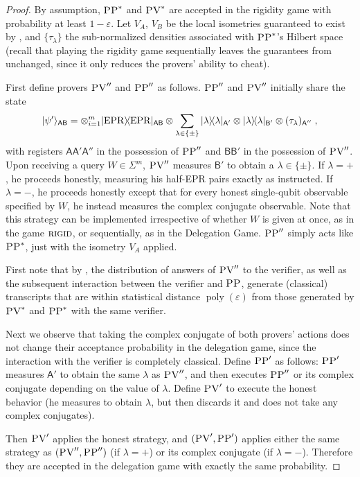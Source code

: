 \documentclass{toc}
\newcommand{\ket}[1]{|#1\rangle}
\newcommand{\bra}[1]{\langle#1|}
\newcommand{\proj}[1]{\ket{#1}\!\bra{#1}}
\DeclareMathOperator{\poly}{poly}
\newcommand{\reg}[1]{{\textsf{#1}}}
\newcommand{\eps}{\varepsilon}
\newcommand{\EPR}{{\rm EPR}}
\newcommand{\rigid}{\textsc{rigid}}
\newcommand{\pv}{\textsc{PV}}
\newcommand{\pp}{\textsc{PP}}
\begin{document}
\begin{proof}
By assumption, $\pp^*$ and $\pv^*$ are accepted in the rigidity game with
  probability at least $1-\eps$. Let $V_A$, $V_B$ be the local isometries
  guaranteed to exist by , and
  $\{\tau_\lambda\}$ the sub-normalized densities associated with $\pp^*$'s
  Hilbert space (recall that playing the rigidity game sequentially leaves the
  guarantees from  unchanged, since it only reduces the provers' ability to cheat).

First define provers $\pv''$ and $\pp''$ as follows. $\pp''$ and $\pv''$ initially share the state 
$$\ket{\psi'}_{\reg{AB}} = \otimes_{i=1}^{m} \proj{\EPR}_{\reg{AB}} \otimes \sum_{\lambda\in\{\pm\}}  \proj{\lambda}_{\reg{A}'}\otimes \proj{\lambda}_{\reg{B}'}\otimes (\tau_\lambda)_{\reg{A}''}\;,$$
with registers $\reg{A}\reg{A}'\reg{A}''$ in the possession of $\pp''$ and $\reg{BB}'$ in the possession of $\pv''$. 
Upon receiving a query $W\in \Sigma^m$, $\pv''$ measures $\reg{B}'$ to obtain a $\lambda\in\{\pm\}$. If $\lambda=+$, he proceeds honestly, measuring his half-EPR pairs exactly as instructed. If $\lambda=-$, he proceeds honestly except that for every honest single-qubit observable specified by $W$, he instead measures the complex conjugate observable. Note that this strategy can be implemented irrespective of whether $W$ is given at once, as in the game $\rigid$, or sequentially, as in the Delegation Game. $\pp''$ simply acts like $\pp^*$, just with the isometry $V_A$ applied. 

First note that by , the distribution of answers of $\pv''$ to the verifier, as well as the subsequent interaction between the verifier and $\pp$, generate (classical) transcripts that are within statistical distance $\poly(\eps)$ from those generated by $\pv^*$ and $\pp^*$ with the same verifier. 

Next we observe that taking the complex conjugate of both provers' actions does not change their acceptance probability in the delegation game, since the interaction with the verifier is completely classical. Define $\pp'$ as follows: $\pp'$ measures $\reg{A}'$ to obtain the same $\lambda$ as $\pv''$, and then executes $\pp''$ or its complex conjugate depending on the value of $\lambda$. Define $\pv'$ to execute the honest behavior (he measures to obtain $\lambda$, but then discards it and does not take any complex conjugates). 

Then $\pv'$ applies the honest strategy, and $(\pv',\pp')$ applies either the same strategy as $(\pv'',\pp'')$ (if $\lambda=+$) or its complex conjugate (if $\lambda=-$). Therefore they are accepted in the delegation game with exactly the same probability. 
\end{proof}
\end{document}
